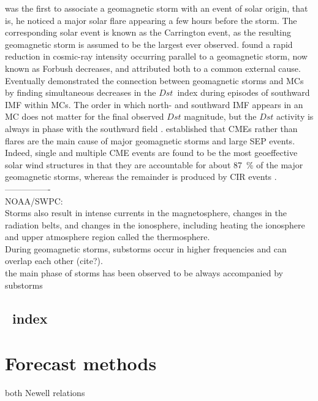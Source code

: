 \citet{Carrington1859} was the first to associate a geomagnetic storm with an event of solar origin, that is, he noticed a major solar flare appearing a few hours before the storm. The corresponding solar event is known as the Carrington event, as the resulting geomagnetic storm is assumed to be the largest ever observed. \citet{Forbush1937} found a rapid reduction in cosmic-ray intensity occurring parallel to a geomagnetic storm, now known as Forbush decreases, and attributed both to a common external cause. Eventually \citet{Wilson1987} demonstrated the connection between geomagnetic storms and MCs by finding simultaneous decreases in the $Dst$~index during episodes of southward IMF within MCs. The order in which north- and southward IMF appears in an MC does not matter for the final observed $Dst$ magnitude, but the $Dst$ activity is always in phase with the southward field \citep{Zhang1988}. \citet{Gosling1993} established that CMEs rather than flares are the main cause of major geomagnetic storms and large SEP events. Indeed, single and multiple CME events are found to be the most geoeffective solar wind structures in that they are accountable for about \SI{87}{\%} of the major geomagnetic storms, whereas the remainder is produced by CIR events \citep{Zhang2007}.\\


----------------\\

NOAA/SWPC:\\
Storms also result in intense currents in the magnetosphere, changes in the radiation belts, and changes in the ionosphere, including heating the ionosphere and upper atmosphere region called the thermosphere.\\


During geomagnetic storms, substorms occur in higher frequencies and can overlap each other (cite?).\\

the main phase of storms has been observed to be always accompanied by substorms \citep{Gonzalez1994}\\



\subsection{\Kp~index}
\label{sec:kp_index}

\section{Forecast methods}
\label{sec:forecast_methods}
both Newell relations\\

